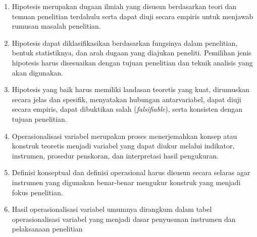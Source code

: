 \documentclass[
  indonesian,
  letterpaper,
  DIV=11,
  numbers=noendperiod]{scrreprt}
\providecommand{\tightlist}{%
  \setlength{\itemsep}{0pt}\setlength{\parskip}{0pt}}
\begin{document}
\begin{tcolorbox}[enhanced jigsaw, colframe=quarto-callout-tip-color-frame, toptitle=1mm, breakable, leftrule=.75mm, arc=.35mm, toprule=.15mm, colback=white, colbacktitle=quarto-callout-tip-color!10!white, bottomtitle=1mm, bottomrule=.15mm, titlerule=0mm, title=\textcolor{quarto-callout-tip-color}{\faLightbulb}\hspace{0.5em}{Rangkuman}, coltitle=black, left=2mm, opacitybacktitle=0.6, opacityback=0, rightrule=.15mm]

\begin{enumerate}
\def\labelenumi{\arabic{enumi}.}
\tightlist
\item
  Hipotesis merupakan dugaan ilmiah yang disusun berdasarkan teori dan
  temuan penelitian terdahulu serta dapat diuji secara empiris untuk
  menjawab rumusan masalah penelitian.
\item
  Hipotesis dapat diklasifikasikan berdasarkan fungsinya dalam
  penelitian, bentuk statistiknya, dan arah dugaan yang diajukan
  peneliti. Pemilihan jenis hipotesis harus disesuaikan dengan tujuan
  penelitian dan teknik analisis yang akan digunakan.
\item
  Hipotesis yang baik harus memiliki landasan teoretis yang kuat,
  dirumuskan secara jelas dan spesifik, menyatakan hubungan
  antarvariabel, dapat diuji secara empiris, dapat dibuktikan salah
  (\emph{falsifiable}), serta konsisten dengan tujuan penelitian.
\item
  Operasionalisasi variabel merupakan proses menerjemahkan konsep atau
  konstruk teoretis menjadi variabel yang dapat diukur melalui
  indikator, instrumen, prosedur penskoran, dan interpretasi hasil
  pengukuran.
\item
  Definisi konseptual dan definisi operasional harus disusun secara
  selaras agar instrumen yang digunakan benar-benar mengukur konstruk
  yang menjadi fokus penelitian.
\item
  Hasil operasionalisasi variabel umumnya dirangkum dalam tabel
  operasionalisasi variabel yang menjadi dasar penyusunan instrumen dan
  pelaksanaan penelitian
\end{enumerate}

\end{tcolorbox}
\end{document}
